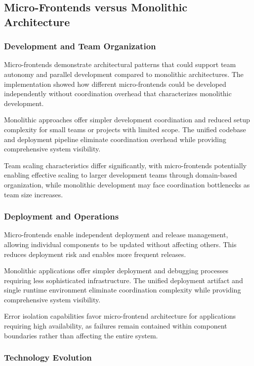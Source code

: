 \documentclass[12pt,a4paper]{report}
\begin{document}
\subsection{Micro-Frontends versus Monolithic Architecture}

\subsubsection{Development and Team Organization}

Micro-frontends demonstrate architectural patterns that could support team autonomy and parallel development compared to monolithic architectures. The implementation showed how different micro-frontends could be developed independently without coordination overhead that characterizes monolithic development.

Monolithic approaches offer simpler development coordination and reduced setup complexity for small teams or projects with limited scope. The unified codebase and deployment pipeline eliminate coordination overhead while providing comprehensive system visibility.

Team scaling characteristics differ significantly, with micro-frontends potentially enabling effective scaling to larger development teams through domain-based organization, while monolithic development may face coordination bottlenecks as team size increases.

\subsubsection{Deployment and Operations}

Micro-frontends enable independent deployment and release management, allowing individual components to be updated without affecting others. This reduces deployment risk and enables more frequent releases.

Monolithic applications offer simpler deployment and debugging processes requiring less sophisticated infrastructure. The unified deployment artifact and single runtime environment eliminate coordination complexity while providing comprehensive system visibility.

Error isolation capabilities favor micro-frontend architecture for applications requiring high availability, as failures remain contained within component boundaries rather than affecting the entire system.

\subsubsection{Technology Evolution}
\end{document}
